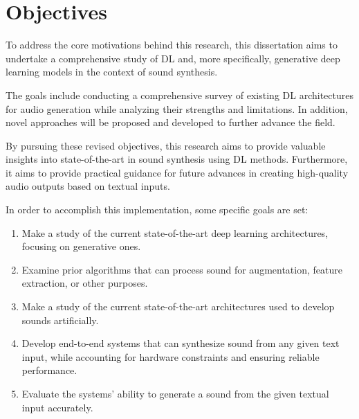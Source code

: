 \section{Objectives} \label{sec:objectives}

To address the core motivations behind this research, this dissertation aims to undertake a comprehensive study of \ac{DL} and, more specifically, generative deep learning models in the context of sound synthesis.

The goals include conducting a comprehensive survey of existing \ac{DL} architectures for audio generation while analyzing their strengths and limitations. In addition, novel approaches will be proposed and developed to further advance the field.

By pursuing these revised objectives, this research aims to provide valuable insights into state-of-the-art in sound synthesis using \ac{DL} methods. Furthermore, it aims to provide practical guidance for future advances in creating high-quality audio outputs based on textual inputs.

In order to accomplish this implementation, some specific goals are set:

\begin{enumerate}
	\item Make a study of the current state-of-the-art deep learning architectures, focusing on generative ones.
	\item Examine prior algorithms that can process sound for augmentation, feature extraction, or other purposes.
	\item Make a study of the current state-of-the-art architectures used to develop sounds artificially.
	\item Develop end-to-end systems that can synthesize sound from any given text input, while accounting for hardware constraints and ensuring reliable performance.
	\item Evaluate the systems' ability to generate a sound from the given textual input accurately.
\end{enumerate}